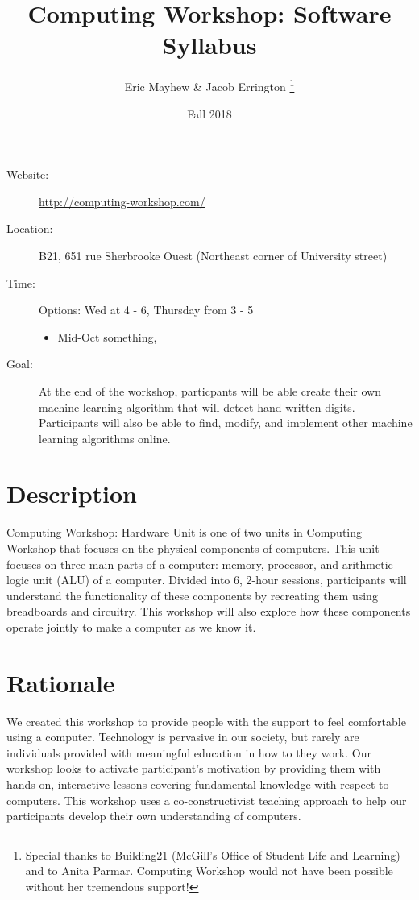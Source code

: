 \documentclass[11pt]{article}
\author{%
  Eric Mayhew \& Jacob Errington%
  \footnote{%
    Special thanks to Building21 (McGill's Office of Student Life and Learning)
    and to Anita Parmar.
    Computing Workshop would not have been possible without her tremendous
    support!
  }
}
\title{Computing Workshop: Software Syllabus}
\date{Fall 2018}
\begin{document}
\maketitle

\begin{description}
  \item[Website:]
    \url{http://computing-workshop.com/}

  \item[Location:]
    B21, 651 rue Sherbrooke Ouest
    (Northeast corner of University street)

  \item[Time:]
    Options: Wed at 4 - 6, Thursday from 3 - 5
    \begin{itemize}
      \item Mid-Oct something,
    \end{itemize}

  \item[Goal:]
    At the end of the workshop, particpants will be able create their own
    machine learning algorithm that will detect hand-written
    digits. Participants will also be able to find, modify, and implement other
    machine learning algorithms online.

\end{description}

\section*{Description}

Computing Workshop: Hardware Unit is one of two units in Computing Workshop that
focuses on the physical components of computers. This unit focuses on three main
parts of a computer: memory, processor, and arithmetic logic unit (ALU) of a
computer. Divided into 6, 2-hour sessions, participants will understand the
functionality of these components by recreating them using breadboards and
circuitry. This workshop will also explore how these components operate jointly
to make a computer as we know it.

\section*{Rationale}

We created this workshop to provide people with the support to feel comfortable
using a computer. Technology is pervasive in our society, but rarely are
individuals provided with meaningful education in how to they work. Our workshop
looks to activate participant's motivation by providing them with hands on,
interactive lessons covering fundamental knowledge with respect to computers.
This workshop uses a co-constructivist teaching approach to help our
participants develop their own understanding of computers.
\end{document}
